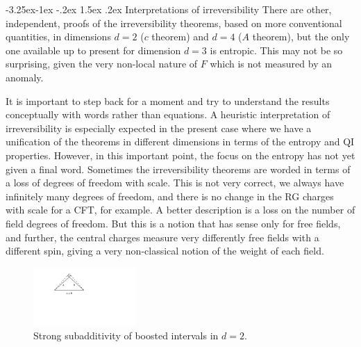 \documentclass[11pt]{article}
\makeatletter
\renewcommand\subsection{\@startsection{subsection}{2}{\z@}%
                                   {-3.25ex\@plus -1ex \@minus -.2ex}%
                                     {1.5ex \@plus .2ex}%
                                     {\normalfont\bfseries}}
\numberwithin{equation}{section}
\makeatother
\begin{document}
\subsection{Interpretations of irreversibility}
There are other, independent, proofs of the irreversibility theorems, based on more conventional quantities,  in dimensions $d=2$ ($c$ theorem) and $d=4$ ($A$ theorem), but the only one available up to present for dimension $d=3$ is entropic. This may not be so surprising, given the very non-local nature of $F$ which is not measured by an anomaly. 

It is important to step back for a moment and try to understand the results conceptually with words rather than equations. A heuristic interpretation of irreversibility is especially expected in the present case where we have a unification of the theorems in different dimensions in terms of the entropy and QI properties. However, in this important point, the focus on the entropy has not yet given a final word. 
Sometimes the irreversibility theorems are worded in terms of a loss of degrees of freedom with scale. This is not very correct, we always have infinitely many degrees of freedom, and there is no change in the RG charges with scale for a CFT, for example. A better description is a loss on the number of field degrees of freedom. But this is a notion that has sense only for free fields, and further, the central charges measure very differently free fields with a different spin, giving a very non-classical notion of the weight of each field.   

\begin{figure}[t]
\begin{center}
\includegraphics[width=0.35\textwidth]{triangulo.pdf} 
\caption{Strong subadditivity of boosted intervals in $d=2$.}
\label{triangle}
\end{center}
\end{figure}
\end{document}
